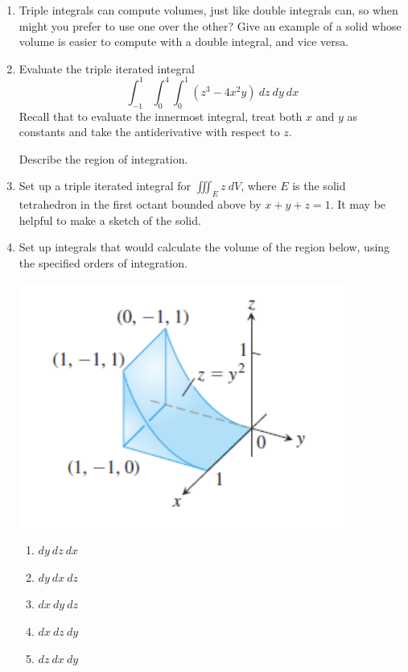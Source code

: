 \begin{enumerate}
    \item Triple integrals can compute volumes, just like double integrals can, so when might you prefer to use one over the other? Give an example of a solid whose volume is easier to compute with a double integral, and vice versa. 
    
    \item Evaluate the triple iterated integral
	   \begin{equation*}
	       \int_{-1}^1\int_{0}^4\int_0^1 (z^3-4x^2y)\ dz\ dy\ dx
	   \end{equation*}
	Recall that to evaluate the innermost integral, treat both $x$ and $y$ as constants and take the antiderivative with respect to $z$.
	
	Describe the region of integration.
       	
	\item Set up a triple iterated integral for $\iiint_E z\ dV$, where $E$ is the solid tetrahedron in the first octant bounded above by $x+y+z=1$. It may be helpful to make a sketch of the solid.
    
    \item Set up integrals that would calculate the volume of the region below, using the specified orders of integration.
	\begin{center}
		\includegraphics[scale=0.45,alt={region above the square with -1<y<0,0<x<1 under the surface z=y^2}]{15_5pic.PNG}
	\end{center}
	
	\begin{multicols}{5}
    \begin{enumerate}
		\item $dy \ dz \ dx$
		\item $dy \ dx \ dz$
		\item $dx \ dy \ dz$
		\item $dx \ dz \ dy$
		\item $dz \ dx \ dy$
	\end{enumerate}
    \end{multicols}
\end{enumerate}

